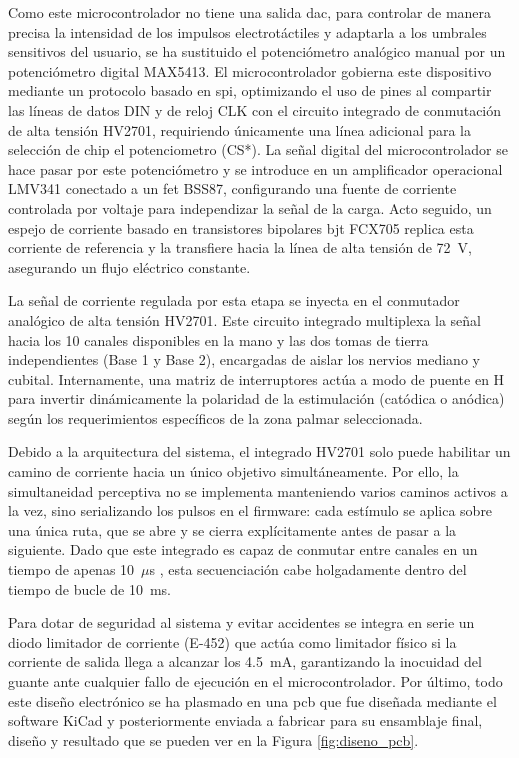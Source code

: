 \documentclass[12pt]{article}
\begin{document}
Como este microcontrolador no tiene una salida \gls{dac}, para controlar de manera precisa la intensidad de los impulsos electrotáctiles y adaptarla a los umbrales sensitivos del usuario, se ha sustituido el potenciómetro analógico manual por un potenciómetro digital MAX5413. El microcontrolador gobierna este dispositivo mediante un protocolo basado en \gls{spi}, optimizando el uso de pines al compartir las líneas de datos DIN y de reloj CLK con el circuito integrado de conmutación de alta tensión HV2701, requiriendo únicamente una línea adicional para la selección de chip el potenciometro (CS*). La señal digital del microcontrolador se hace pasar por este potenciómetro y se introduce en un amplificador operacional LMV341 conectado a un \gls{fet} BSS87, configurando una fuente de corriente controlada por voltaje para independizar la señal de la carga. Acto seguido, un espejo de corriente basado en transistores bipolares \gls{bjt} FCX705 replica esta corriente de referencia y la transfiere hacia la línea de alta tensión de 72~V, asegurando un flujo eléctrico constante.

La señal de corriente regulada por esta etapa se inyecta en el conmutador analógico de alta tensión HV2701. Este circuito integrado multiplexa la señal hacia los 10 canales disponibles en la mano y las dos tomas de tierra independientes (Base 1 y Base 2), encargadas de aislar los nervios mediano y cubital. Internamente, una matriz de interruptores actúa a modo de puente en H para invertir dinámicamente la polaridad de la estimulación (catódica o anódica) según los requerimientos específicos de la zona palmar seleccionada.

Debido a la arquitectura del sistema, el integrado HV2701 solo puede habilitar un camino de corriente hacia un único objetivo simultáneamente. Por ello, la simultaneidad perceptiva no se implementa manteniendo varios caminos activos a la vez, sino serializando los pulsos en el firmware: cada estímulo se aplica sobre una única ruta, que se abre y se cierra explícitamente antes de pasar a la siguiente. Dado que este integrado es capaz de conmutar entre canales en un tiempo de apenas 10~$\mu$s \cite{HV2701_DataSheet}, esta secuenciación cabe holgadamente dentro del tiempo de bucle de 10~ms.

Para dotar de seguridad al sistema y evitar accidentes se integra en serie un diodo limitador de corriente (E-452) que actúa como limitador físico si la corriente de salida llega a alcanzar los 4.5~mA, garantizando la inocuidad del guante ante cualquier fallo de ejecución en el microcontrolador. Por último, todo este diseño electrónico se ha plasmado en una \gls{pcb} que fue diseñada mediante el software KiCad y posteriormente enviada a fabricar para su ensamblaje final, diseño y resultado que se pueden ver en la Figura \ref{fig:diseno_pcb}.
\end{document}
